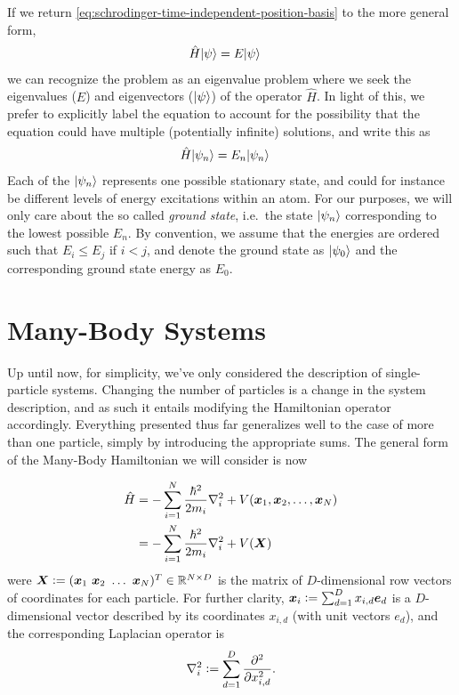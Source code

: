 \documentclass[Thesis.tex]{subfiles}
\begin{document}
If we return \autoref{eq:schrodinger-time-independent-position-basis} to the more general
form,
\begin{align}
    \hat H | \psi \rangle &= E| \psi \rangle
\end{align}
we can recognize the problem as an eigenvalue problem where we seek the eigenvalues ($E$)
and eigenvectors ($| \psi \rangle$) of the operator $\hat H$. In light of this, we prefer to
explicitly label the equation to account for the possibility that the equation could have
multiple (potentially infinite) solutions, and write this as
\begin{align}
    \hat H| \psi_n \rangle &= E_n| \psi_n \rangle
\end{align}
Each of the $| \psi_n \rangle$ represents one possible stationary state, and could for instance be
different levels of energy excitations within an atom. For our purposes, we will only care
about the so called \emph{ground state}, i.e.\ the state $| \psi_n \rangle$ corresponding to the
lowest possible $E_n$. By convention, we assume that the energies are ordered such that $E_i
\leq E_j$ if $i < j$, and denote the ground state as $| \psi_0 \rangle$ and the corresponding ground
state energy as $E_0$.


\section{Many-Body Systems}

Up until now, for simplicity, we've only considered the description of single-particle
systems. Changing the number of particles is a change in the system description, and as
such it entails modifying the Hamiltonian operator accordingly. Everything presented thus
far generalizes well to the case of more than one particle, simply by introducing the
appropriate sums. The general form of the Many-Body Hamiltonian we will consider is now

\begin{align}
    \hat H &= - \sum_{i=1}^N \frac{\hbar^2}{2m_i} \laplacian_i + V(\vb x_1, \vb x_2,\dots,
    \vb x_N)\\
    &= -\sum_{i=1}^N \frac{\hbar^2}{2m_i} \laplacian_i + V(\vb
    X)\label{eq:Hamiltonian-operator-general}
\end{align}
were $\bm{X} \vcentcolon= (\bm{x}_1\ \bm{x}_2\ \dots\ \bm{x}_N)^T\in \mathbb{R}^{N\times D}$ is the matrix
of $D$-dimensional row vectors of coordinates for each particle. For further clarity,
$\bm{x}_i \vcentcolon= \sum_{d=1}^D x_{i,d} \bm{e}_d$ is a $D$-dimensional vector described by
its coordinates $x_{i,d}$ (with unit vectors $e_d$), and the corresponding Laplacian
operator is
\begin{align}
    \laplacian_i \defeq \sum_{d = 1}^D \pdv[2]{}{x_{i,d}}.
\end{align}
\end{document}

